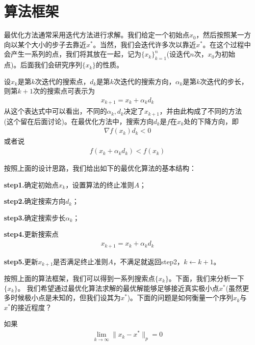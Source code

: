 \section{算法框架}
    \par
    最优化方法通常采用迭代方法进行求解。我们给定一个初始点$x_0$，然后按照某一方向以某个大小的步子去靠近$x^{*}$。当然，我们会迭代许多次以靠近$x^{*}$。在这个过程中会产生一系列的点，我们将其放在一起，记为$\{x_k\}_{k=1}^n$(设迭代$n$次，$x_0$为初始点)。后面我们会研究序列$\{x_k\}$的性质。
    \par
    设$x_k$是第$k$次迭代的搜索点，$d_k$是第$k$次迭代的搜索方向，$\alpha_k$是第$k$次迭代的步长，则第$k+1$次的搜索点可表示为
    \begin{align*}
    x_{k+1}=x_k+{{\alpha}_k}{d_k}
    \end{align*}
    从这个表达式中可以看出，不同的${\alpha}_k,{d_k}$决定了$x_{k+1}$，并由此构成了不同的方法(这个留在后面讨论)。在最优化方法中，搜索方向$d_k$是$f$在$x_k$处的下降方向，即
    \begin{align*}
      \nabla f(x_k)d_k<0
    \end{align*}
    或者说
    \begin{align*}
      f(x_k+{\alpha}_k d_k)<f(x_k)
    \end{align*}
    \par
    按照上面的设计思路，我们给出如下的最优化算法的基本结构：\par
    \textbf{step1.}确定初始点$x_k$，设置算法的终止准则$A$；\par
    \textbf{step2.}确定搜索方向$d_k$；\par
    \textbf{step3.}确定搜索步长${\alpha}_k$；\par
    \textbf{step4.}更新搜索点
    \begin{align*}
    x_{k+1}=x_k+{\alpha}_k d_k
    \end{align*}
    \par
    \textbf{step5.}更新$x_{k+1}$是否满足终止准则$A$，不满足就返回step2，$k \leftarrow {k+1}$。
    \par
    按照上面的算法框架，我们可以得到一系列搜索点$\{x_k\}$。下面，我们来分析一下$\{x_k\}$。
    我们希望通过最优化算法求解的最优解能够足够接近真实极小点$x^{*}$(虽然更多时候极小点是未知的，但我们设其为$x^{*}$)。下面的问题是如何衡量一个序列${x_k}$与$x^*$的接近程度？
    \par
    如果
    \begin{align*}
    \mathop {\lim}\limits_{k \to \infty } \|x_k-x^{*}\|_p=0
    \end{align*}

